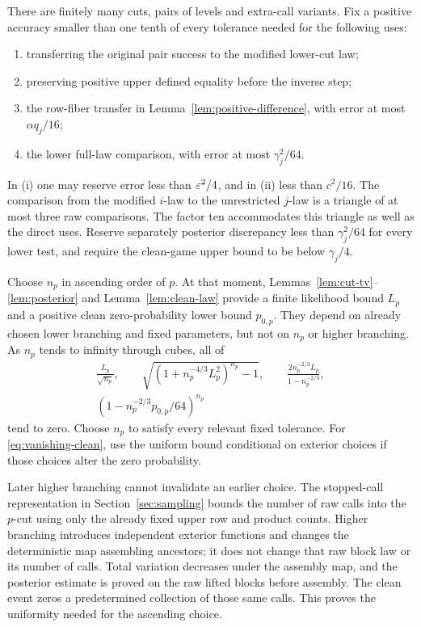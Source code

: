 There are finitely many cuts, pairs of levels and extra-call variants.
Fix a positive accuracy smaller than one tenth of every tolerance needed
for the following uses:
\begin{enumerate}[label=\textup{(\roman*)}]
\item transferring the original pair success to the modified lower-cut law;
\item preserving positive upper defined equality before the inverse step;
\item the row-fiber transfer in Lemma~\ref{lem:positive-difference}, with
error at most $\alpha q_j/16$;
\item the lower full-law comparison, with error at most $\gamma_j^2/64$.
\end{enumerate}
In \textup{(i)} one may reserve error less than $\varepsilon^2/4$, and in
\textup{(ii)} less than $c^2/16$.
The comparison from the modified $i$-law to the unrestricted $j$-law is
a triangle of at most three raw comparisons. The factor ten accommodates
this triangle as well as the direct uses. Reserve separately posterior
discrepancy less than $\gamma_j^2/64$ for every lower test, and require the
clean-game upper bound to be below $\gamma_j/4$.

Choose $n_p$ in ascending order of $p$.
At that moment, Lemmas~\ref{lem:cut-tv}--\ref{lem:posterior}
and Lemma~\ref{lem:clean-law} provide a finite likelihood bound $L_p$
and a positive clean zero-probability lower bound $p_{0,p}$.
They depend on already chosen lower branching and fixed parameters,
but not on $n_p$ or higher branching.
As $n_p$ tends to infinity through cubes, all of
\begin{gather}
 \frac{L_p}{\sqrt{n_p}},\qquad
 \sqrt{(1+n_p^{-4/3}L_p^2)^{n_p}-1},\qquad
 \frac{2n_p^{-2/3}L_p}{1-n_p^{-2/3}}, \label{eq:vanishing-errors}\\
 (1-n_p^{-2/3}p_{0,p}/64)^{n_p}
 \label{eq:vanishing-clean}
\end{gather}
tend to zero. Choose $n_p$ to satisfy every relevant fixed tolerance.
For \eqref{eq:vanishing-clean}, use the uniform bound conditional on exterior
choices if those choices alter the zero probability.

Later higher branching cannot invalidate an earlier choice.
The stopped-call representation in Section~\ref{sec:sampling} bounds the number
of raw calls into the $p$-cut using only the already fixed upper row and
product counts. Higher branching introduces independent exterior functions
and changes the deterministic map assembling ancestors; it does not change
that raw block law or its number of calls.
Total variation decreases under the assembly map, and the posterior estimate
is proved on the raw lifted blocks before assembly.
The clean event zeros a predetermined collection of those same calls.
This proves the uniformity needed for the ascending choice.

